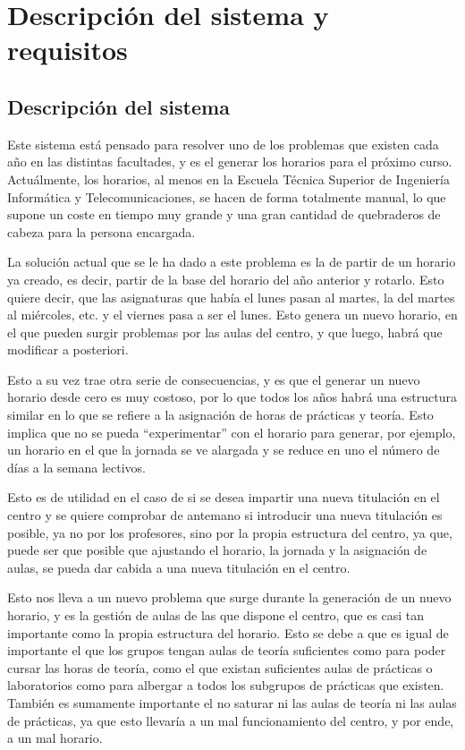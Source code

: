 \chapter{Descripción del sistema y requisitos}

\section{Descripción del sistema}

Este sistema está pensado para resolver uno de los problemas que existen cada año en las distintas facultades, y es el generar los horarios para el próximo curso. Actuálmente, los horarios, al menos en la Escuela Técnica Superior de Ingeniería Informática y Telecomunicaciones, se hacen de forma totalmente manual, lo que supone un coste en tiempo muy grande y una gran cantidad de quebraderos de cabeza para la persona encargada. 

La solución actual que se le ha dado a este problema es la de partir de un horario ya creado, es decir, partir de la base del horario del año anterior y rotarlo. Esto quiere decir, que las asignaturas que había el lunes pasan al martes, la del martes al miércoles, etc. y el viernes pasa a ser el lunes. Esto genera un nuevo horario, en el que pueden surgir problemas por las aulas del centro, y que luego, habrá que modificar a posteriori.

Esto a su vez trae otra serie de consecuencias, y es que el generar un nuevo horario desde cero es muy costoso, por lo que todos los años habrá una estructura similar en lo que se refiere a la asignación de horas de prácticas y teoría. Esto implica que no se pueda ``experimentar'' con el horario para generar, por ejemplo, un horario en el que la jornada se ve alargada y se reduce en uno el número de días a la semana lectivos.

Esto es de utilidad en el caso de si se desea impartir una nueva titulación en el centro y se quiere comprobar de antemano si introducir una nueva titulación es posible, ya no por los profesores, sino por la propia estructura del centro, ya que, puede ser que posible que ajustando el horario, la jornada y la asignación de aulas, se pueda dar cabida a una nueva titulación en el centro.

Esto nos lleva a un nuevo problema que surge durante la generación de un nuevo horario, y es la gestión de aulas de las que dispone el centro, que es casi tan importante como la propia estructura del horario. Esto se debe a que es igual de importante el que los grupos tengan aulas de teoría suficientes como para poder cursar las horas de teoría, como el que existan suficientes aulas de prácticas o laboratorios como para albergar a todos los subgrupos de prácticas que existen. También es sumamente importante el no saturar ni las aulas de teoría ni las aulas de prácticas, ya que esto llevaría a un mal funcionamiento del centro, y por ende, a un mal horario.

